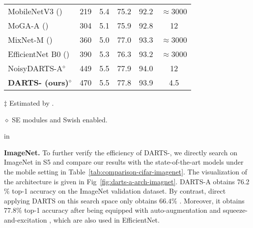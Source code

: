 \documentclass{article} \usepackage{iclr2021_conference,times}
\newcommand{\citeyp}[1]{(\citeyear{#1})}
\begin{document}
\begin{table}[tb!]
\begin{center}
\begin{scriptsize}
\begin{minipage}{0.5\textwidth}
\begin{threeparttable}
\begin{tabular}{*{2}{l}*{3}{l}c}
				\midrule
				MobileNetV3 \citeyp{howard2019searching} & 219 & 5.4 &75.2 &92.2&$\approx$3000 \\
MoGA-A \citeyp{chumoga} & 304 & 5.1 & 75.9 & 92.8 & 12 \\
				MixNet-M \citeyp{tan2020mixconv} &360 & 5.0 & 77.0 & 93.3& $\approx$3000\\
				EfficientNet B0 \citeyp{tan2019efficientnet} &390 & 5.3  & 76.3 &93.2 &$\approx$3000 \\
				NoisyDARTS-A$^{\diamond}$ &449 & 5.5 & 77.9 & 94.0 & 12\\


\textbf{DARTS- (ours)}$^\diamond$ & 470  & 5.5 &  77.8& 93.9 &4.5 \\
				\bottomrule
			\end{tabular}
			\begin{tablenotes}
			\scriptsize
			\item[$\ddagger$] Estimated by \cite{wu2018fbnet}.
			\item[${\diamond}$] SE modules and Swish enabled. 
			\end{tablenotes}
			\end{threeparttable}
			\end{minipage}
		\end{scriptsize}
	\end{center}
	 in
\end{table}








\textbf{ImageNet.}
To further verify the efficiency of DARTS-, we directly search on ImageNet in S5 and compare our results with the state-of-the-art models under the mobile setting in Table~\ref{tab:comparison-cifar-imagenet}. The visualization of the architecture is given in Fig~\ref{fig:darts-a-arch-imagnet}. DARTS-A obtains 76.2$\%$ top-1 accuracy on the ImageNet validation dataset. By contrast, direct applying DARTS on this search space only obtains $66.4\%$ \citep{chu2019fair}. Moreover, it obtains 77.8$\%$ top-1 accuracy after being equipped with auto-augmentation \citep{cubuk2018autoaugment} and squeeze-and-excitation \citep{hu2018squeeze}, which are also used in EfficientNet.
\end{document}
